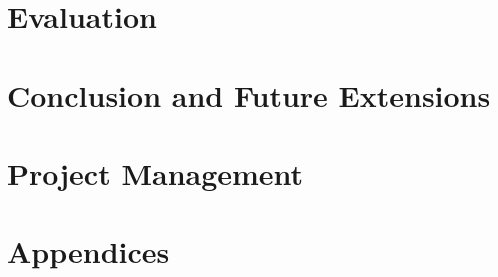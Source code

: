 \documentclass[11pt,a4paper,oneside]{report}
\begin{document}
\chapter{Evaluation}




\chapter{Conclusion and Future Extensions}

\chapter{Project Management}




\nocite{*} %





\chapter{Appendices}
\end{document}
